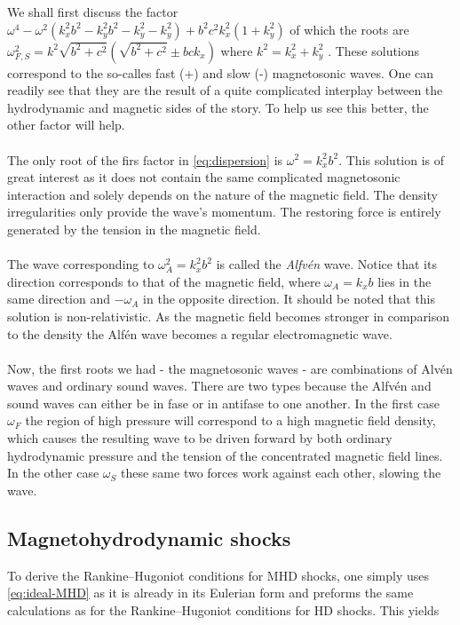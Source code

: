 We shall first discuss the factor $ \omega^4 - \omega^2(k_x^2 b^2 - k_y^2 b^2 - k_y^2 - k_y^2) + b^2 c^2 k_x^2(1 + k_y^2) $ of which the roots are $ \omega^2_{F,S} = k^2 \sqrt{b^2 + c^2}(\sqrt{b^2 + c^2} \pm bck_x) $ where $k^2 = k_x^2 + k_y^2$ . These solutions correspond to the so-calles fast (+) and slow (-) magnetosonic waves. One can readily see that they are the result of a quite complicated interplay between the hydrodynamic and magnetic sides of the story. To help us see this better, the other factor will help.\\
\\
The only root of the firs factor in \autoref{eq:dispersion} is $ \omega^2 = k_x^2 b^2 $. This solution is of great interest as it does not contain the same complicated magnetosonic interaction and solely depends on the nature of the magnetic field. The density irregularities only provide the wave's momentum. The restoring force is entirely generated by the tension in the magnetic field.\\
\\
The wave corresponding to $\omega_A^2 = k_x^2 b^2$ is called the \textit{Alfvén} wave. Notice that its direction corresponds to that of the magnetic field, where $\omega_A = k_x b$ lies in the same direction and $-\omega_A$ in the opposite direction. It should be noted that this solution is non-relativistic. As the magnetic field becomes stronger in comparison to the density the Alfén wave becomes a regular electromagnetic wave.\\
\\
Now, the first roots we had - the magnetosonic waves - are combinations of Alvén waves and ordinary sound waves. There are two types because the Alfvén and sound waves can either be in fase or in antifase to one another. In the first case $\omega_F$ the region of high pressure will correspond to a high magnetic field density, which causes the resulting wave to be driven forward by both ordinary hydrodynamic pressure and the tension of the concentrated magnetic field lines. In the other case $\omega_S$ these same two forces work against each other, slowing the wave.


\subsection*{Magnetohydrodynamic shocks}

To derive the Rankine–Hugoniot conditions for MHD shocks, one simply uses \autoref{eq:ideal-MHD} as it is already in its Eulerian form and preforms the same calculations as for the Rankine–Hugoniot conditions for HD shocks. This yields

